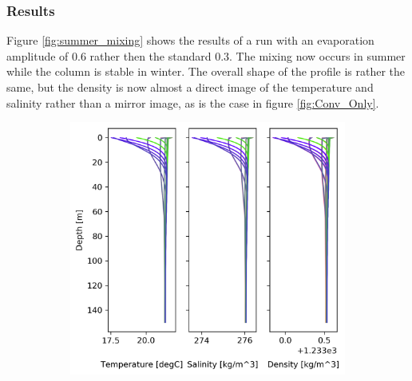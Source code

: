 \documentclass[twocolumn]{article}
\begin{document}
\subsubsection{Results}
Figure \ref{fig:summer_mixing} shows the results of a run with an evaporation amplitude of 0.6 rather then the standard 0.3. The mixing now occurs in summer while the column is stable in winter. The overall shape of the profile is rather the same, but the density is now almost a direct image of the temperature and salinity rather than a mirror image, as is the case in figure \ref{fig:Conv_Only}. 
\begin{figure}
\begin{subfigure}[h]{0.7\textwidth}
\centering
\includegraphics[width=\textwidth,keepaspectratio]{summer_mixing.png}
\end{subfigure}\hfill
\begin{subfigure}[h]{0.20\textwidth}
\centering

\end{subfigure}
\end{figure}
\end{document}
